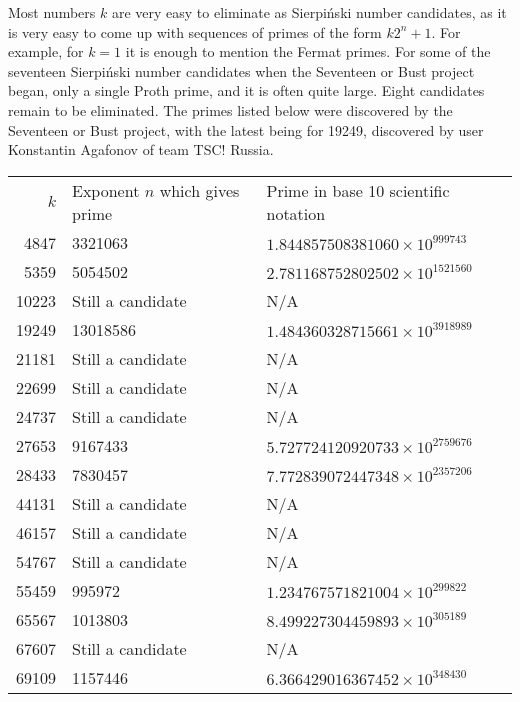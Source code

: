 \documentclass[12pt]{article}
\begin{document}
Most numbers $k$ are very easy to eliminate as Sierpi\'nski number candidates, as it is very easy to come up with sequences of primes of the form $k2^n + 1$. For example, for $k = 1$ it is enough to mention the Fermat primes. For some of the seventeen Sierpi\'nski number candidates when the Seventeen or Bust project began, only a single Proth prime, and it is often quite large. Eight candidates remain to be eliminated. The primes listed below were discovered by the Seventeen or Bust project, with the latest being for 19249, discovered by user Konstantin Agafonov of team TSC! Russia.

\begin{tabular}{|r|l|l|}
$k$ & Exponent $n$ which gives prime & Prime in base 10 scientific notation \\
4847 & 3321063 & $1.844857508381060 \times 10^{999743}$ \\
5359 & 5054502 & $2.781168752802502 \times 10^{1521560}$ \\
10223 & Still a candidate & N/A \\
19249 & 13018586 & $1.484360328715661 \times 10^{3918989}$ \\
21181 & Still a candidate & N/A \\
22699 & Still a candidate & N/A \\
24737 & Still a candidate & N/A \\
27653 & 9167433 & $5.727724120920733 \times 10^{2759676}$ \\
28433 & 7830457 & $7.772839072447348 \times 10^{2357206}$ \\
44131 & Still a candidate & N/A \\
46157 & Still a candidate & N/A \\
54767 & Still a candidate & N/A \\
55459 & 995972 & $1.234767571821004 \times 10^{299822}$ \\
65567 & 1013803 & $8.499227304459893 \times 10^{305189}$ \\
67607 & Still a candidate & N/A \\
69109 & 1157446 & $6.366429016367452 \times 10^{348430}$ \\
\end{tabular}

\end{document}

